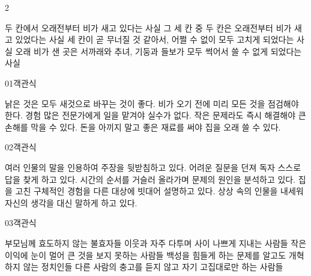 \documentclass[fs9,seriesFre]{korfarm-base}
\begin{document}
\begin{kfSentenceUnit}{2}{}
\begin{kfChoices}
\kfChoice 두 칸에서 오래전부터 비가 새고 있다는 사실
\kfChoice 그 세 칸 중 두 칸은 오래전부터 비가 새고 있었다는 사실
\kfChoice 세 칸이 곧 무너질 것 같아서, 어쩔 수 없이 모두 고치게 되었다는 사실
\kfChoice 오래 비가 샌 곳은 서까래와 추녀, 기둥과 들보가 모두 썩어서 쓸 수 없게 되었다는 사실
\end{kfChoices}
\end{kfSentenceUnit}

\kfEndMC


\par\medskip
\kfBeginMC
\begin{kfQBlock}{01}{객관식}
\begin{kfChoices}
\kfChoice 낡은 것은 모두 새것으로 바꾸는 것이 좋다.
\kfChoice 비가 오기 전에 미리 모든 것을 점검해야 한다.
\kfChoice 경험 많은 전문가에게 일을 맡겨야 실수가 없다.
\kfChoice 작은 문제라도 즉시 해결해야 큰 손해를 막을 수 있다.
\kfChoice 돈을 아끼지 말고 좋은 재료를 써야 집을 오래 쓸 수 있다.
\end{kfChoices}
\end{kfQBlock}
\begin{kfQBlock}{02}{객관식}
\begin{kfChoices}
\kfChoice 여러 인물의 말을 인용하여 주장을 뒷받침하고 있다.
\kfChoice 어려운 질문을 던져 독자 스스로 답을 찾게 하고 있다.
\kfChoice 시간의 순서를 거슬러 올라가며 문제의 원인을 분석하고 있다.
\kfChoice 집을 고친 구체적인 경험을 다른 대상에 빗대어 설명하고 있다.
\kfChoice 상상 속의 인물을 내세워 자신의 생각을 대신 말하게 하고 있다.
\end{kfChoices}
\end{kfQBlock}
\begin{kfQBlock}{03}{객관식}
\begin{kfChoices}
\kfChoice 부모님께 효도하지 않는 불효자들
\kfChoice 이웃과 자주 다투며 사이 나쁘게 지내는 사람들
\kfChoice 작은 이익에 눈이 멀어 큰 것을 보지 못하는 사람들
\kfChoice 백성을 힘들게 하는 문제를 알고도 개혁하지 않는 정치인들
\kfChoice 다른 사람의 충고를 듣지 않고 자기 고집대로만 하는 사람들
\end{kfChoices}
\end{kfQBlock}
\end{document}
